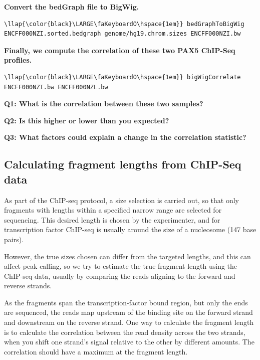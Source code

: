\documentclass[11pt]{article}
\begin{document}
    \textbf{Convert the bedGraph file to BigWig.}

\begin{terminalinput}
\begin{Verbatim}[commandchars=\\\{\}]
\llap{\color{black}\LARGE\faKeyboardO\hspace{1em}} bedGraphToBigWig ENCFF000NZI.sorted.bedgraph genome/hg19.chrom.sizes ENCFF000NZI.bw
\end{Verbatim}
\end{terminalinput}

\newpage

    \textbf{Finally, we compute the correlation of these two PAX5 ChIP-Seq
profiles.}

\begin{terminalinput}
\begin{Verbatim}[commandchars=\\\{\}]
\llap{\color{black}\LARGE\faKeyboardO\hspace{1em}} bigWigCorrelate ENCFF000NZI.bw ENCFF000NZL.bw
\end{Verbatim}
\end{terminalinput}


    \textbf{Q1: What is the correlation between these two samples?}

    \textbf{Q2: Is this higher or lower than you expected?}

    \textbf{Q3: What factors could explain a change in the correlation
statistic?}

    \subsection{Calculating fragment lengths from ChIP-Seq
data}\label{calculating-fragment-lengths-from-chip-seq-data}

    As part of the ChIP-seq protocol, a size selection is carried out, so
that only fragments with lengths within a specified narrow range are
selected for sequencing. This desired length is chosen by the
experimenter, and for transcription factor ChIP-seq is usually around
the size of a nucleosome (147 base pairs).

However, the true sizes chosen can differ from the targeted lengths, and
this can affect peak calling, so we try to estimate the true fragment
length using the ChIP-seq data, usually by comparing the reads aligning
to the forward and reverse strands.

As the fragments span the transcription-factor bound region, but only
the ends are sequenced, the reads map upstream of the binding site on
the forward strand and downstream on the reverse strand. One way to
calculate the fragment length is to calculate the correlation between
the read density across the two strands, when you shift one strand's
signal relative to the other by different amounts. The correlation
should have a maximum at the fragment length.
\end{document}
